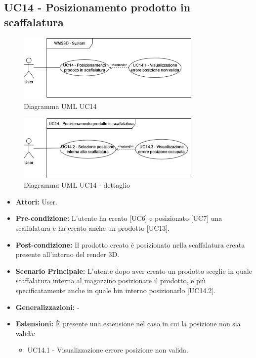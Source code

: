 \subsection{UC14 - Posizionamento prodotto in scaffalatura}
\begin{figure}[H]
  \centering
  \includegraphics[width=0.8\textwidth]{UC_diagrams_11-20/UC14_sys.drawio.png}
   \caption{Diagramma UML UC14}
\end{figure}
\begin{figure}[H]
  \centering
  \includegraphics[width=0.8\textwidth]{UC_diagrams_11-20/UC14.drawio.png}
   \caption{Diagramma UML UC14 - dettaglio}
\end{figure}
\begin{itemize}
    \item \textbf{Attori:} User.
    \item \textbf{Pre-condizione:}  L'utente ha creato [UC6] e posizionato [UC7] una scaffalatura e ha creato anche un prodotto [UC13].
    \item \textbf{Post-condizione:} Il prodotto creato è posizionato nella scaffalatura creata presente all'interno del render 3D.
    \item \textbf{Scenario Principale:} L'utente dopo aver creato un prodotto sceglie in quale scaffalatura interna al magazzino posizionare il prodotto, e più specificatamente anche in quale bin interno posizionarlo [UC14.2].
    \item \textbf{Generalizzazioni:} -
    \item \textbf{Estensioni:} È presente una estensione nel caso in cui la posizione non sia valida:
    \begin{itemize}
        \item UC14.1 - Visualizzazione errore posizione non valida.
    \end{itemize}
\end{itemize}


